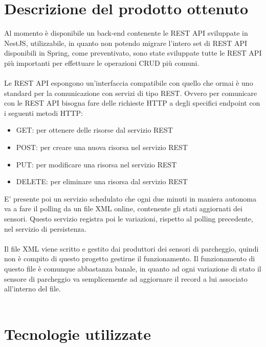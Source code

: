 \section{Descrizione del prodotto ottenuto}

Al momento è disponibile un back-end contenente le REST API sviluppate in NestJS, utilizzabile,
in quanto non potendo migrare l'intero set di REST API disponibili in Spring, come preventivato,
sono state sviluppate tutte le REST API più importanti per effettuare le operazioni CRUD più
comuni.
\\\\
Le REST API espongono un'interfaccia compatibile con quello che ormai è uno standard per la
comunicazione con servizi di tipo REST. Ovvero per comunicare con le REST API bisogna fare
delle richieste HTTP a degli specifici endpoint con i seguenti metodi HTTP:
\begin{itemize}
    \item GET: per ottenere delle risorse dal servizio REST
    \item POST: per creare una nuova risorsa nel servizio REST
    \item PUT: per modificare una risorsa nel servizio REST
    \item DELETE: per eliminare una risorsa dal servizio REST
\end{itemize}
\leavevmode\newline
E' presente poi un servizio schedulato che ogni due minuti in maniera autonoma va a fare il polling
da un file XML online, contenente gli stati aggiornati dei sensori. Questo servizio registra poi 
le variazioni, rispetto
al polling precedente, nel servizio di persistenza.
\\\\
Il file XML viene scritto e gestito dai produttori dei sensori di parcheggio, quindi non è compito di questo 
progetto gestirne il funzionamento. Il funzionamento di questo file è comunque abbastanza banale,
in quanto ad ogni variazione di stato il sensore di parcheggio va semplicemente ad aggiornare 
il record a lui associato
all'interno del file.
\\\\

\section{Tecnologie utilizzate}

